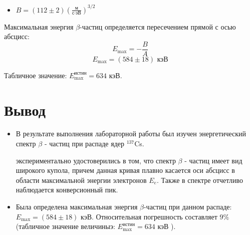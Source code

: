 \documentclass{article}
\begin{document}
\begin{enumerate}
\begin{itemize}
			\item $B = (112 \pm 2) (\frac{\text{м}}{\text{с} \cdot \text{эВ}})^{3/2 }$
		
            \end{itemize}
  Максимальная энергия $\beta$-частиц определяется пересечением прямой с осью абсцисс:
		\begin{equation*}
			E_\text{max} = -\frac{B}{A}
		\end{equation*}
		\begin{equation*}
			\boxed{E_\text{max} = (584 \pm 18) \text{ кэВ}}
		\end{equation*}
		
		
		Табличное значение: $E_\text{max}^\text{истин} = 634 \text{ кэВ}$.
	\end{enumerate}
	
	
	\section{Вывод}
 \begin{itemize}
     \item В результате выполнения лабораторной работы был изучен энергетический спектр $\beta$ - частиц при распаде ядер $^{137}$Cs.  
	
 экспериментально удостоверились в том,  что спектр $\beta$ - частиц имеет вид широкого купола,  причем данная кривая плавно касается оси абсцисс в области максимальной энергии электронов $E_e$. Также в спектре отчетливо наблюдается конверсионный пик.


\item Была определена максимальная энергия $\beta$-частиц при данном распаде: $E_\text{max} = (584 \pm 18)$ кэВ. Относительная погрешность составляет $ 9\%$ (табличное значение величиныэ: $E_\text{max}^\text{истин} = 634 \text{ кэВ}$ ).


 \end{itemize}
	 

\newpage
\end{document}
